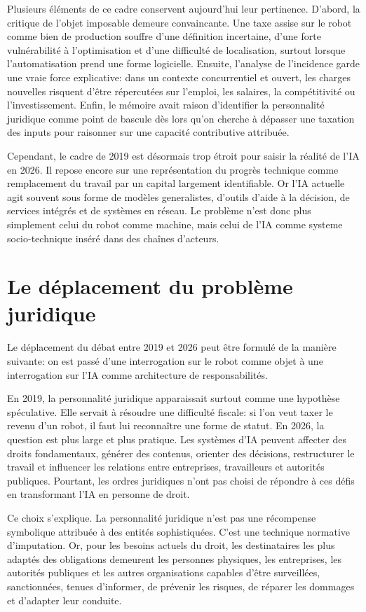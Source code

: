 \documentclass[11pt]{article}
\begin{document}
Plusieurs éléments de ce cadre conservent aujourd'hui leur pertinence. D'abord, la critique de l'objet imposable demeure convaincante. Une taxe assise sur le robot comme bien de production souffre d'une définition incertaine, d'une forte vulnérabilité à l'optimisation et d'une difficulté de localisation, surtout lorsque l'automatisation prend une forme logicielle. Ensuite, l'analyse de l'incidence garde une vraie force explicative: dans un contexte concurrentiel et ouvert, les charges nouvelles risquent d'être répercutées sur l'emploi, les salaires, la compétitivité ou l'investissement. Enfin, le mémoire avait raison d'identifier la personnalité juridique comme point de bascule dès lors qu'on cherche à dépasser une taxation des inputs pour raisonner sur une capacité contributive attribuée.

Cependant, le cadre de 2019 est désormais trop étroit pour saisir la réalité de l'IA en 2026. Il repose encore sur une représentation du progrès technique comme remplacement du travail par un capital largement identifiable. Or l'IA actuelle agit souvent sous forme de modèles generalistes, d'outils d'aide à la décision, de services intégrés et de systèmes en réseau. Le problème n'est donc plus simplement celui du robot comme machine, mais celui de l'IA comme systeme socio-technique inséré dans des chaînes d'acteurs.

\section{Le déplacement du problème juridique}
Le déplacement du débat entre 2019 et 2026 peut être formulé de la manière suivante: on est passé d'une interrogation sur le robot comme objet à une interrogation sur l'IA comme architecture de responsabilités.

En 2019, la personnalité juridique apparaissait surtout comme une hypothèse spéculative. Elle servait à résoudre une difficulté fiscale: si l'on veut taxer le revenu d'un robot, il faut lui reconnaître une forme de statut. En 2026, la question est plus large et plus pratique. Les systèmes d'IA peuvent affecter des droits fondamentaux, générer des contenus, orienter des décisions, restructurer le travail et influencer les relations entre entreprises, travailleurs et autorités publiques. Pourtant, les ordres juridiques n'ont pas choisi de répondre à ces défis en transformant l'IA en personne de droit.

Ce choix s'explique. La personnalité juridique n'est pas une récompense symbolique attribuée à des entités sophistiquées. C'est une technique normative d'imputation. Or, pour les besoins actuels du droit, les destinataires les plus adaptés des obligations demeurent les personnes physiques, les entreprises, les autorités publiques et les autres organisations capables d'être surveillées, sanctionnées, tenues d'informer, de prévenir les risques, de réparer les dommages et d'adapter leur conduite.
\end{document}
